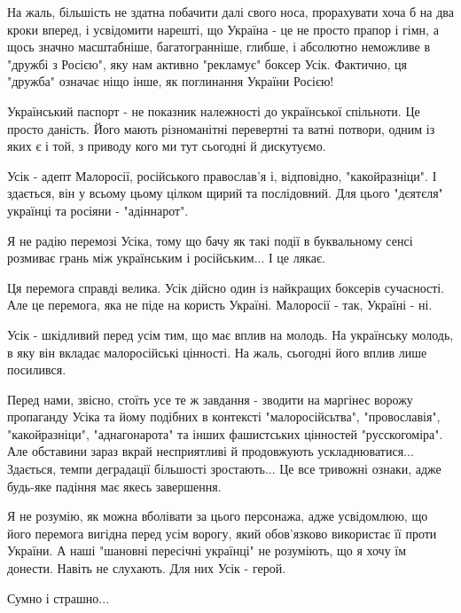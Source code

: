 На жаль, більшість не здатна побачити далі свого носа, прорахувати хоча б на
два кроки вперед, і усвідомити нарешті, що Україна - це не просто прапор і
гімн, а щось значно масштабніше, багатогранніше, глибше, і абсолютно неможливе
в "дружбі з Росією", яку нам активно "рекламує" боксер Усік. Фактично, ця
"дружба" означає ніщо інше, як поглинання України Росією!

Український паспорт - не показник належності до української спільноти. Це
просто даність. Його мають різноманітні перевертні та ватні потвори, одним із
яких є і той, з приводу кого ми тут сьогодні й дискутуємо.

Усік - адепт Малоросії, російського православ'я і, відповідно, "какойразніци".
І здається, він у всьому цьому цілком щирий та послідовний. Для цього "дєятєля"
українці та росіяни - "адіннарот".

Я не радію перемозі Усіка, тому що бачу як такі події в буквальному сенсі
розмиває грань між українським і російським... І це лякає.

Ця перемога справді велика. Усік дійсно один із найкращих боксерів сучасності.
Але це перемога, яка не піде на користь Україні. Малоросії - так, Україні - ні.

Усік - шкідливий перед усім тим, що має вплив на молодь. На українську молодь,
в яку він вкладає малоросійські цінності. На жаль, сьогодні його вплив лише
посилився. 

Перед нами, звісно, стоїть усе те ж завдання - зводити на маргінес ворожу
пропаганду Усіка та йому подібних в контексті "малоросійсьтва", "провославія",
"какойразніци", "аднагонарота" та інших фашистських цінностей "русскогоміра".
Але обставини зараз вкрай несприятливі й продовжують ускладнюватися...
Здається, темпи деградації більшості зростають... Це все тривожні ознаки, адже
будь-яке падіння має якесь завершення.

Я не розумію, як можна вболівати за цього персонажа, адже усвідомлюю, що його
перемога вигідна перед усім ворогу, який обов'язково використає її проти
України. А наші "шановні пересічні українці" не розуміють, що я хочу їм
донести. Навіть не слухають. Для них Усік - герой. 

Сумно і страшно...

